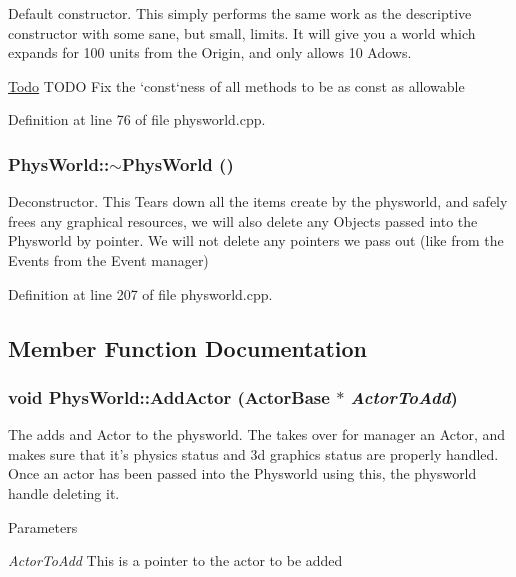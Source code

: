 Default constructor. This simply performs the same work as the descriptive constructor with some sane, but small, limits. It will give you a world which expands for 100 units from the Origin, and only allows 10 Adows.

\begin{Desc}
\item[\hyperlink{todo__todo000005}{Todo}]TODO Fix the `const`ness of all methods to be as const as allowable \end{Desc}


Definition at line 76 of file physworld.cpp.\hypertarget{classPhysWorld_acdfe3b4c1c236860dc7dff945cfe5b07}{
\subsubsection[{$\sim$PhysWorld}]{\setlength{\rightskip}{0pt plus 5cm}PhysWorld::$\sim$PhysWorld ()}}
\label{db/df5/classPhysWorld_acdfe3b4c1c236860dc7dff945cfe5b07}


Deconstructor. This Tears down all the items create by the physworld, and safely frees any graphical resources, we will also delete any Objects passed into the Physworld by pointer. We will not delete any pointers we pass out (like from the Events from the Event manager) 

Definition at line 207 of file physworld.cpp.

\subsection{Member Function Documentation}
\hypertarget{classPhysWorld_ae490054b3e1c4c5aa69cb8e3b7bd2f29}{
\subsubsection[{AddActor}]{\setlength{\rightskip}{0pt plus 5cm}void PhysWorld::AddActor ({\bf ActorBase} $\ast$ {\em ActorToAdd})}}
\label{db/df5/classPhysWorld_ae490054b3e1c4c5aa69cb8e3b7bd2f29}


The adds and Actor to the physworld. The takes over for manager an Actor, and makes sure that it's physics status and 3d graphics status are properly handled. Once an actor has been passed into the Physworld using this, the physworld handle deleting it. 
\begin{DoxyParams}{Parameters}
\item[{\em ActorToAdd}]This is a pointer to the actor to be added \end{DoxyParams}



